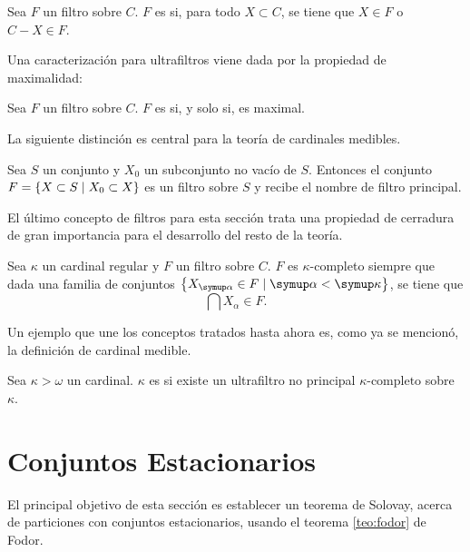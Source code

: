 \documentclass
[
  12pt,
  letterpaper,
  openany,
  oneside,
]{book}
\begin{document}
\begin{defi}
    Sea $F$ un filtro sobre $C$. $F$ es  si, para todo $X\subset C$,
    se tiene que $X\in F$ o $C-X\in F$.
\end{defi}

Una caracterización para ultrafiltros viene dada por la propiedad
de maximalidad:

\begin{teo}
    Sea $F$ un filtro sobre $C$. $F$ es  si, y solo si, es maximal.
\end{teo}

La siguiente distinción es central para la teoría de cardinales medibles.

\begin{defi}
	Sea $S$ un conjunto y $X_0$ un subconjunto no vacío de  $S$. Entonces
	el conjunto $F = \left\{ X\subset S\mid X_0\subset X \right\}$ es un filtro sobre $S$
	y recibe el nombre de filtro principal.
\end{defi}

El último concepto de filtros para esta sección trata una propiedad
de cerradura de gran importancia para el desarrollo del resto de la teoría.

\begin{defi}
    Sea $\kappa$ un cardinal regular y $F$ un filtro sobre $C$.
    $F$ es $\kappa$-completo siempre que dada una familia de conjuntos
    $\set{X_\alpha\in F\mid \alpha<\kappa}$,
    se tiene que
    \[
        \bigcap X_\alpha \in F.
    \]
\end{defi}

Un ejemplo que une los conceptos tratados hasta ahora es, como ya se mencionó,
la definición de cardinal medible.

\begin{defi}
    Sea $\kappa > \omega$ un cardinal. $\kappa$ es  si existe
    un ultrafiltro no principal $\kappa\text{-completo}$ sobre $\kappa$.
\end{defi}

\section{Conjuntos Estacionarios}

El principal objetivo de esta sección es establecer un teorema
de Solovay, acerca de particiones
con conjuntos estacionarios, usando el teorema \ref{teo:fodor}
de Fodor.
\end{document}
